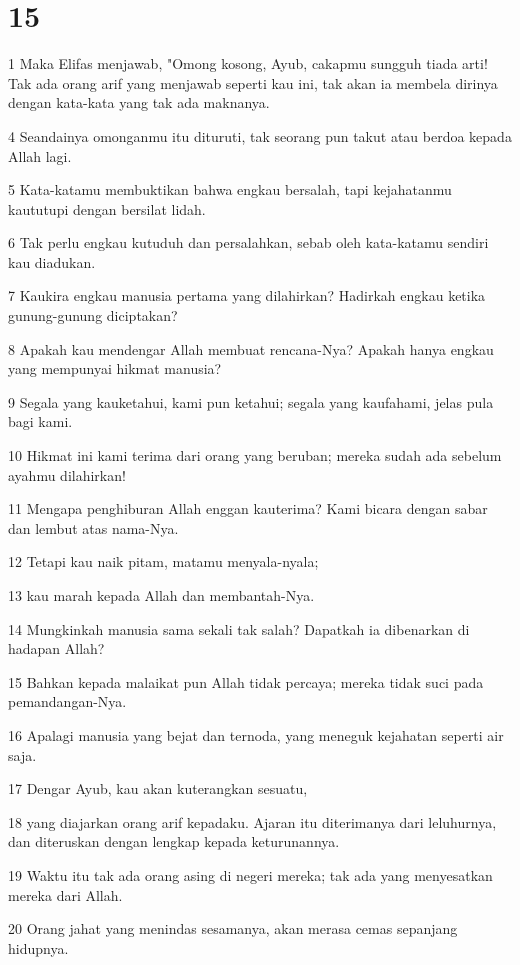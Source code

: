 \chapter{15}

\par 1 Maka Elifas menjawab, "Omong kosong, Ayub, cakapmu sungguh tiada arti! Tak ada orang arif yang menjawab seperti kau ini, tak akan ia membela dirinya dengan kata-kata yang tak ada maknanya.
\par 4 Seandainya omonganmu itu dituruti, tak seorang pun takut atau berdoa kepada Allah lagi.
\par 5 Kata-katamu membuktikan bahwa engkau bersalah, tapi kejahatanmu kaututupi dengan bersilat lidah.
\par 6 Tak perlu engkau kutuduh dan persalahkan, sebab oleh kata-katamu sendiri kau diadukan.
\par 7 Kaukira engkau manusia pertama yang dilahirkan? Hadirkah engkau ketika gunung-gunung diciptakan?
\par 8 Apakah kau mendengar Allah membuat rencana-Nya? Apakah hanya engkau yang mempunyai hikmat manusia?
\par 9 Segala yang kauketahui, kami pun ketahui; segala yang kaufahami, jelas pula bagi kami.
\par 10 Hikmat ini kami terima dari orang yang beruban; mereka sudah ada sebelum ayahmu dilahirkan!
\par 11 Mengapa penghiburan Allah enggan kauterima? Kami bicara dengan sabar dan lembut atas nama-Nya.
\par 12 Tetapi kau naik pitam, matamu menyala-nyala;
\par 13 kau marah kepada Allah dan membantah-Nya.
\par 14 Mungkinkah manusia sama sekali tak salah? Dapatkah ia dibenarkan di hadapan Allah?
\par 15 Bahkan kepada malaikat pun Allah tidak percaya; mereka tidak suci pada pemandangan-Nya.
\par 16 Apalagi manusia yang bejat dan ternoda, yang meneguk kejahatan seperti air saja.
\par 17 Dengar Ayub, kau akan kuterangkan sesuatu,
\par 18 yang diajarkan orang arif kepadaku. Ajaran itu diterimanya dari leluhurnya, dan diteruskan dengan lengkap kepada keturunannya.
\par 19 Waktu itu tak ada orang asing di negeri mereka; tak ada yang menyesatkan mereka dari Allah.
\par 20 Orang jahat yang menindas sesamanya, akan merasa cemas sepanjang hidupnya.
